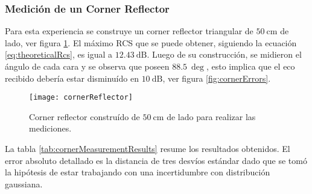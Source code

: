 \subsubsection{Medición de un Corner Reflector}

Para esta experiencia se construye un corner reflector triangular de $\SI{50}{\centi\meter}$ de lado, ver figura \ref{fig:corner}. El máximo RCS que se puede obtener, siguiendo la ecuación \ref{eq:theoreticalRcs}, es igual a $\SI{12.43}{\dB}$. Luego de su construcción, se midieron el ángulo de cada cara y se observa que poseen $\SI{88.5}{\deg}$, esto implica que el eco recibido debería estar disminuído en $\SI{10}{\dB}$, ver figura \ref{fig:cornerErrors}.
\begin{figure}[htb]
  \centering
  \texttt{[image: cornerReflector]}
  \caption{Corner reflector construído de $\SI{50}{\centi\meter}$ de lado para realizar las mediciones.}
  \label{fig:corner}
\end{figure}
La tabla \ref{tab:cornerMeasurementResults} resume los resultados obtenidos. El error absoluto detallado es la distancia de tres desvíos estándar dado que se tomó la hipótesis de estar trabajando con una incertidumbre con distribución gaussiana.

